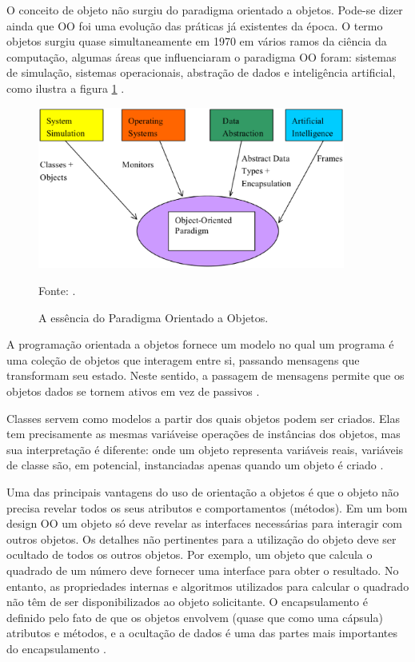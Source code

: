O conceito de objeto não surgiu do paradigma orientado a objetos. Pode-se dizer ainda que OO foi uma evolução das práticas já existentes da época. O termo objetos surgiu quase simultaneamente em 1970 em vários ramos da ciência da computação, algumas áreas que influenciaram o paradigma OO foram: sistemas de simulação, sistemas operacionais, abstração de dados e inteligência artificial, como ilustra a figura \ref{essenciaOO} \cite[pág.~1]{capretz2003}.

\begin{figure}[htp]
\centering
\includegraphics[width=0.9\textwidth]{figuras/essenciaOO}
\caption{A essência do Paradigma Orientado a Objetos.}{Fonte: .} 
\label{essenciaOO}
\end{figure}

A programação orientada a objetos fornece um modelo no qual um programa é uma coleção de objetos que interagem entre si, passando mensagens que transformam seu estado. Neste sentido, a passagem de mensagens permite que os objetos dados se tornem ativos em vez de passivos \cite[pág.~310]{tucker2009}.

Classes servem como modelos a partir dos quais objetos podem ser criados. Elas tem precisamente as mesmas variáveise operações de instâncias dos objetos, mas sua interpretação é diferente: onde um objeto representa variáveis reais, variáveis de classe são, em potencial, instanciadas apenas quando um objeto é criado  \cite[pág.~10]{wegner1990}.

Uma das principais vantagens do uso de orientação a objetos é que o objeto não precisa revelar todos os seus atributos e comportamentos (métodos). Em um bom design OO um objeto só deve revelar as interfaces necessárias para interagir com outros objetos. Os detalhes não pertinentes para a utilização do objeto deve ser ocultado de todos os outros objetos. Por exemplo, um objeto que calcula o quadrado de um número deve fornecer uma interface para obter o resultado. No entanto, as propriedades internas e algoritmos utilizados para calcular o quadrado não têm de ser disponibilizados ao objeto solicitante. O encapsulamento  é definido pelo fato de que os objetos envolvem (quase que como uma cápsula) atributos e métodos, e a ocultação de dados é uma das partes mais importantes do encapsulamento \cite[pág.~19]{weisfeld2009}.

